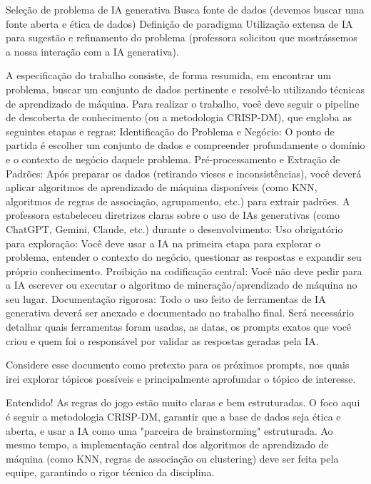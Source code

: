 \begin{description}
    Seleção de problema de IA generativa
    Busca fonte de dados (devemos buscar uma fonte aberta e ética de dados)
    Definição de paradigma
    Utilização extensa de IA para sugestão e refinamento do problema (professora solicitou que mostrássemos a nossa interação com a IA generativa).

    A especificação do trabalho consiste, de forma resumida, em encontrar um problema, buscar um conjunto de dados pertinente e resolvê-lo utilizando técnicas de aprendizado de máquina.
    Para realizar o trabalho, você deve seguir o pipeline de descoberta de conhecimento (ou a metodologia CRISP-DM), que engloba as seguintes etapas e regras:
    Identificação do Problema e Negócio: O ponto de partida é escolher um conjunto de dados e compreender profundamente o domínio e o contexto de negócio daquele problema.
    Pré-processamento e Extração de Padrões: Após preparar os dados (retirando vieses e inconsistências), você deverá aplicar algoritmos de aprendizado de máquina disponíveis (como KNN, algoritmos de regras de associação, agrupamento, etc.) para extrair padrões.
    A professora estabeleceu diretrizes claras sobre o uso de IAs generativas (como ChatGPT, Gemini, Claude, etc.) durante o desenvolvimento:
    Uso obrigatório para exploração: Você deve usar a IA na primeira etapa para explorar o problema, entender o contexto do negócio, questionar as respostas e expandir seu próprio conhecimento.
    Proibição na codificação central: Você não deve pedir para a IA escrever ou executar o algoritmo de mineração/aprendizado de máquina no seu lugar.
    Documentação rigorosa: Todo o uso feito de ferramentas de IA generativa deverá ser anexado e documentado no trabalho final. Será necessário detalhar quais ferramentas foram usadas, as datas, os prompts exatos que você criou e quem foi o responsável por validar as respostas geradas pela IA.

    Considere esse documento como pretexto para os próximos prompts, nos quais irei explorar tópicos possíveis e principalmente aprofundar o tópico de interesse.

    \item[Gemini:] Entendido! As regras do jogo estão muito claras e bem estruturadas. O foco aqui é seguir a metodologia CRISP-DM, garantir que a base de dados seja ética e aberta, e usar a IA como uma "parceira de brainstorming" estruturada. Ao mesmo tempo, a implementação central dos algoritmos de aprendizado de máquina (como KNN, regras de associação ou clustering) deve ser feita pela equipe, garantindo o rigor técnico da disciplina.


\end{description}
